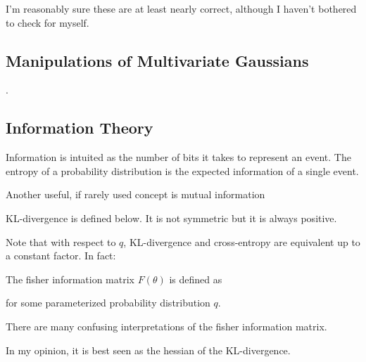 \documentclass[12pt]{article}
\begin{document}
I'm reasonably sure these are at least nearly correct, although I haven't bothered to check for myself.

\subsection{Manipulations of Multivariate Gaussians}
.
\subsection{Information Theory}

Information is intuited as the number of bits it takes to represent an event. The entropy of a probability distribution is the expected information of a single event. 


Another useful, if rarely used concept is mutual information


KL-divergence is defined below. It is not symmetric but it is always positive. 


Note that with respect to $q$, KL-divergence and cross-entropy are equivalent up to a constant factor. In fact:


The fisher information matrix $F(\theta)$ is defined as


for some parameterized probability distribution $q$. 

There are many confusing interpretations of the fisher information matrix.

In my opinion, it is best seen as the hessian of the KL-divergence.

\end{document}
